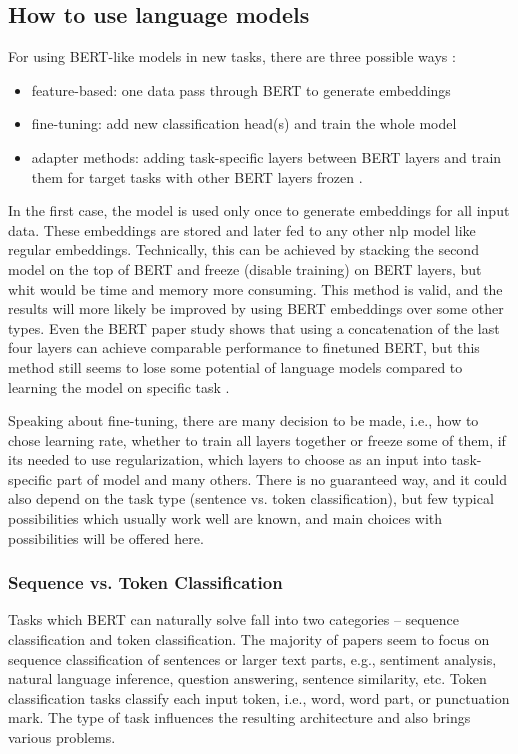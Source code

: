 \subsection{How to use language models}
 \label{sub:howto}
 For using BERT-like models in new tasks, there are three possible ways \citep{Liu2020}: 
 \begin{itemize}
 \item feature-based: one data pass through BERT to generate embeddings
 \item fine-tuning: add new classification head(s) and train the whole model
 \item adapter methods: adding task-specific layers between BERT layers and train them for target tasks with other BERT layers frozen \citep{Stickland2019}.
 \end{itemize}
In the first case, the model is used only once to generate embeddings for all input data. These embeddings are stored and later fed to any other \acrshort{nlp} model like regular embeddings. Technically, this can be achieved by stacking the second model on the top of BERT and freeze (disable training) on BERT layers, but whit would be time and memory more consuming. This method is valid, and the results will more likely be improved by using BERT embeddings over some other types. Even the BERT paper study shows that using a concatenation of the last four layers can achieve comparable performance to finetuned BERT, but this method still seems to lose some potential of language models compared to learning the model on specific task \citep{Sun}.
\par
Speaking about fine-tuning, there are many decision to be made, i.e., how to chose learning rate, whether to train all layers together or freeze some of them, if its needed to use regularization, which layers to choose as an input into task-specific part of model and many others. There is no guaranteed way, and it could also depend on the task type (sentence vs. token classification), but few typical possibilities which usually work well are known, and main choices with possibilities will be offered here.

\subsubsection{Sequence vs. Token Classification}
Tasks which BERT can naturally solve fall into two categories -- sequence classification and token classification. The majority of papers seem to focus on sequence classification of sentences or larger text parts, e.g., sentiment analysis, natural language inference, question answering, sentence similarity, etc. Token classification tasks classify each input token, i.e., word, word part, or punctuation mark. The type of task influences the resulting architecture and also brings various problems.

